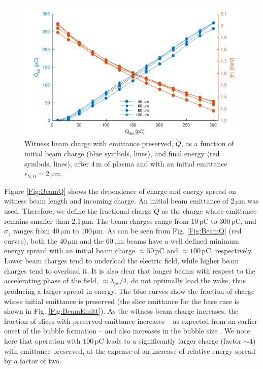 \documentclass[aps,prstab,reprint,amsmath,amssymb,groupedaddress]{revtex4-1}
\newcommand{\unit}[1]{\,\mathrm{#1}}
\begin{document}
\begin{figure}[hbt]
    \includegraphics[width=\linewidth,trim={2mm 0mm 2mm 0mm},clip]{figures/beamQualityAbs}
    \caption{\label{Fig:BeamQAbs} Witness beam charge with emittance preserved, $\widetilde{Q}$, as a function of
        initial beam charge (blue symbols, lines), and final energy (red symbols, lines), after $4\unit{m}$ of plasma
        and with an initial emittance $\epsilon_{\mathrm{N},0}=2\unit{\mu m}$.}
\end{figure}

Figure \ref{Fig:BeamQ} shows the dependence of charge and energy spread on witness beam length and incoming charge. An
initial beam emittance of $2\unit{\mu m}$ was used. Therefore, we define the fractional charge $\widetilde{Q}$ as the
charge whose emittance remains smaller than $2.1\unit{\mu m}$. The beam charges range from $10\unit{pC}$ to
$300\unit{pC}$, and $\sigma_{z}$ ranges from $40\unit{\mu m}$ to $100\unit{\mu m}$. As can be seen from Fig.
\ref{Fig:BeamQ} (red curves), both the $40\unit{\mu m}$ and the $60\unit{\mu m}$ beams have a well defined minimum
energy spread with an initial beam charge $\approx 50\unit{pC}$ and $\approx 100\unit{pC}$, respectively. Lower beam
charges tend to underload the electric field, while higher beam charges tend to overload it. It is also clear that
longer beams with respect to the accelerating phase of the field, $\approx\lambda_{pe}/4$, do not optimally load the
wake, thus producing a larger spread in energy. The blue curves show the fraction of charge whose initial emittance is
preserved (the slice emittance for the base case is shown in Fig. \ref{Fig:BeamEmitt}). As the witness beam charge
increases, the fraction of slices with preserved emittance increases -- as expected from an earlier onset of the bubble
formation -- and also increases in the bubble size \cite{lu:2006-1, lu:2006}. We note here that operation with
$100\unit{pC}$ leads to a significantly larger charge (factor $\sim 4$) with emittance preserved, at the expense of an
increase of relative energy spread by a factor of two.
\end{document}

